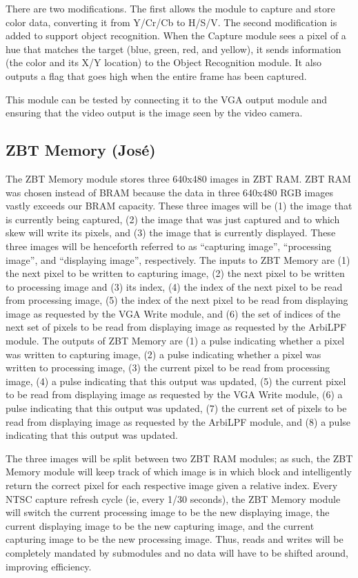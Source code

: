 \documentclass[10pt]{article}
\begin{document}
There are two modifications. The first allows the module to capture and store color data, converting it from Y/Cr/Cb to H/S/V. The second modification is added to support object recognition. When the Capture module sees a pixel of a hue that matches the target (blue, green, red, and yellow), it sends information (the color and its X/Y location) to the Object Recognition module. It also outputs a flag that goes high when the entire frame has been captured.

This module can be tested by connecting it to the VGA output module and ensuring that the video output is the image seen by the video camera.

\subsection{ZBT Memory (Jos\'{e})}
The ZBT Memory module stores three 640x480 images in ZBT RAM. ZBT RAM was chosen instead of BRAM because the data in three 640x480 RGB images vastly exceeds our BRAM capacity. These three images will be (1) the image that is currently being captured, (2) the image that was just captured and to which skew will write its pixels, and (3) the image that is currently displayed. These three images will be henceforth referred to as ``capturing image'', ``processing image'', and ``displaying image'', respectively. The inputs to ZBT Memory are (1) the next pixel to be written to capturing image, (2) the next pixel to be written to processing image and (3) its index, (4) the index of the next pixel to be read from processing image, (5) the index of the next pixel to be read from displaying image as requested by the VGA Write module, and (6) the set of indices of the next set of pixels to be read from displaying image as requested by the ArbiLPF module. The outputs of ZBT Memory are (1) a pulse indicating whether a pixel was written to capturing image, (2) a pulse indicating whether a pixel was written to processing image, (3) the current pixel to be read from processing image, (4) a pulse indicating that this output was updated, (5) the current pixel to be read from displaying image as requested by the VGA Write module, (6) a pulse indicating that this output was updated, (7) the current set of pixels to be read from displaying image as requested by the ArbiLPF module, and (8) a pulse indicating that this output was updated.

The three images will be split between two ZBT RAM modules; as such, the ZBT Memory module will keep track of which image is in which block and intelligently return the correct pixel for each respective image given a relative index. Every NTSC capture refresh cycle (ie, every 1/30 seconds), the ZBT Memory module will switch the current processing image to be the new displaying image, the current displaying image to be the new capturing image, and the current capturing image to be the new processing image. Thus, reads and writes will be completely mandated by submodules and no data will have to be shifted around, improving efficiency.
\end{document}
